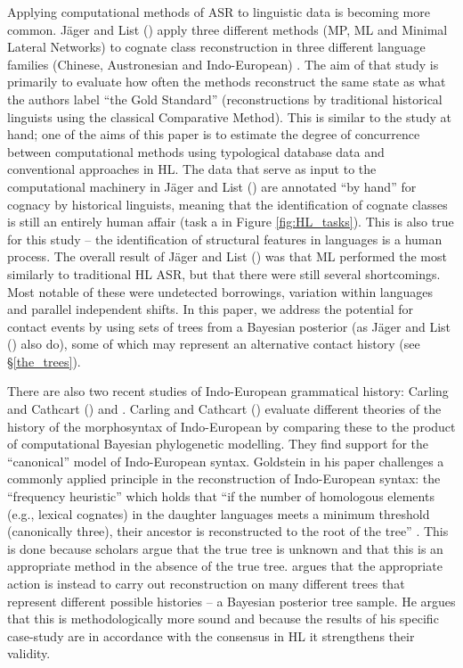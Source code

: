 \documentclass[12pt,letterpaper]{article}
\begin{document}
Applying computational methods of ASR to linguistic data is becoming more common. J\"ager and List (\citeyear{jager2018using}) apply three different methods (MP, ML and Minimal Lateral Networks) to cognate class reconstruction in three different language families (Chinese, Austronesian and Indo-European) . The aim of that study is primarily to evaluate how often the methods reconstruct the same state as what the authors label ``the Gold Standard'' (reconstructions by traditional historical linguists using the classical Comparative Method). This is similar to the study at hand; one of the aims of this paper is to estimate the degree of concurrence between computational methods using typological database data and conventional approaches in HL. The data that serve as input to the computational machinery in J\"ager and List (\citeyear{jager2018using}) are annotated ``by hand'' for cognacy by historical linguists, meaning that the identification of cognate classes is still an entirely human affair (task a in Figure \ref{fig:HL_tasks}). This is also true for this study -- the identification of structural features in languages is a human process. The overall result of J\"ager and List (\citeyear{jager2018using}) was that ML performed the most similarly to traditional HL ASR, but that there were still several shortcomings. Most notable of these were undetected borrowings, variation within languages and parallel independent shifts. In this paper, we address the potential for contact events by using sets of trees from a Bayesian posterior (as J\"ager and List (\citeyear{jager2018using}) also do), some of which may represent an alternative contact history (see §\ref{the_trees}).

There are also two recent studies of Indo-European grammatical history: Carling and Cathcart (\citeyear{carling2021reconstructing}) and \citet{goldstein_2022}. Carling and Cathcart (\citeyear{carling2021reconstructing}) evaluate different theories of the history of the morphosyntax of Indo-European by comparing these to the product of computational Bayesian phylogenetic modelling. They find support for the ``canonical'' model of Indo-European syntax. Goldstein in his paper challenges a commonly applied principle in the reconstruction of Indo-European syntax: the ``frequency heuristic'' which holds that ``if the number of homologous elements (e.g., lexical cognates) in the daughter languages meets a minimum threshold (canonically three), their ancestor is reconstructed to the root of the tree'' \citep[3]{goldstein_2022}. This is done because scholars argue that the true tree is unknown and that this is an appropriate method in the absence of the true tree. \citeauthor{goldstein_2022} argues that the appropriate action is instead to carry out reconstruction on many different trees that represent different possible histories -- a Bayesian posterior tree sample. He argues that this is methodologically more sound and because the results of his specific case-study are in accordance with the consensus in HL it strengthens their validity.
\end{document}
